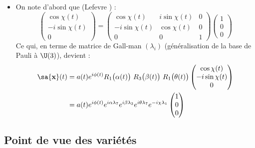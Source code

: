 \begin{itemize}
	\item On note d'abord que (Lefevre \cite{lefevre_polarization_2021}) :
	\[\begin{pmatrix}
		\cos\chi(t) \\ -i\sin\chi(t) \\ 0
	\end{pmatrix} = \begin{pmatrix}
		\cos\chi(t) & i\sin\chi(t) & 0 \\ -i\sin\chi(t) & \cos\chi(t) & 0 \\ 0 & 0 & 1
	\end{pmatrix}\begin{pmatrix}
		1 \\ 0 \\ 0
	\end{pmatrix}\]
	Ce qui, en terme de matrice de Gall-man $(\lambda_i)$ (généralisation de la base de Pauli à $\U(3)$), devient :
	\begin{align*}
		\sa{\bf{x}}(t) &= a(t)e^{i\phi(t)} R_1\big(\alpha(t)\big)\ R_3\big(\beta(t)\big)\ R_1\big(\theta(t)\big)\begin{pmatrix}
			\cos\chi(t) \\ -i\sin\chi(t) \\ 0
		\end{pmatrix} \\
		&= a(t)e^{i\phi(t)} e^{i\alpha \lambda_7} e^{i\beta \lambda_3} e^{i\theta \lambda_7} e^{-i\chi \lambda_1}\begin{pmatrix}
			1 \\ 0 \\ 0
		\end{pmatrix}
	\end{align*}
\end{itemize}




\subsection{Point de vue des variétés}\label{subsec:phaseG_variete}

